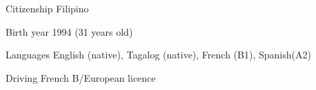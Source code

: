 
\begin{cvskills}

	\cvskill
	{Citizenship}
    {Filipino}

	\cvskill
	{Birth year}
    {1994 (31 years old)}

	\cvskill
	{Languages}
    {English (native), Tagalog (native), French (B1), Spanish(A2)}

	\cvskill
	{Driving}
    {French B/European licence}

\end{cvskills}
